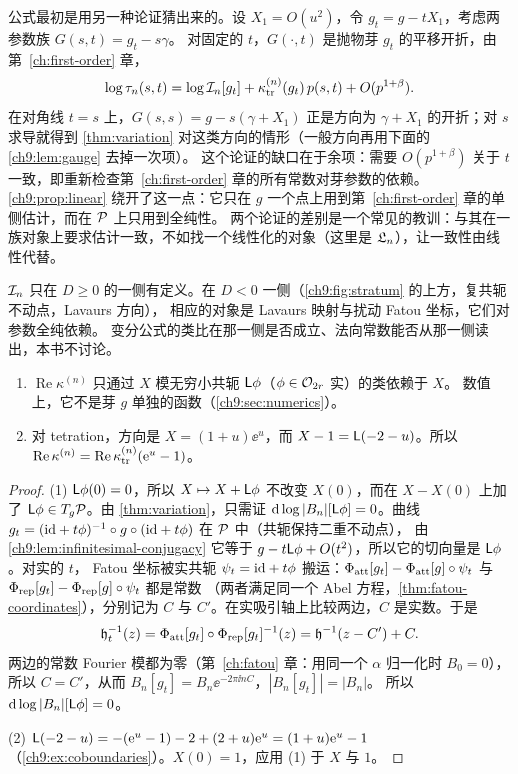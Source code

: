 \begin{remark}[为什么不用两参数论证]\label{ch9:rem:two-parameter}
公式最初是用另一种论证猜出来的。设 $X_1=O(u^2)$，令 $g_t=g-tX_1$，考虑两参数族 $G(s,t)=g_t-s\gamma$。
对固定的 $t$，$G(\cdot,t)$ 是抛物芽 $g_t$ 的平移开折，由第~\ref{ch:first-order} 章，
\[
 \log\tau_n(s,t)=\log\mathcal I_n[g_t]+\kappa_{\mathrm{tr}}^{(n)}(g_t)\,p(s,t)+O(p^{1+\beta}) .
\]
在对角线 $t=s$ 上，$G(s,s)=g-s(\gamma+X_1)$ 正是方向为 $\gamma+X_1$ 的开折；对 $s$ 求导就得到 \cref{thm:variation} 对这类方向的情形（一般方向再用下面的 \cref{ch9:lem:gauge} 去掉一次项）。
这个论证的缺口在于余项：需要 $O(p^{1+\beta})$ 关于 $t$ 一致，即重新检查第~\ref{ch:first-order} 章的所有常数对芽参数的依赖。
\cref{ch9:prop:linear} 绕开了这一点：它只在 $g$ 一个点上用到第~\ref{ch:first-order} 章的单侧估计，而在 $\mathcal P$ 上只用到全纯性。
两个论证的差别是一个常见的教训：与其在一族对象上要求估计一致，不如找一个线性化的对象（这里是 $\mathfrak L_n$），让一致性由线性代替。
\end{remark}

\begin{remark}[另一侧]
$\mathcal I_n$ 只在 $D\ge0$ 的一侧有定义。在 $D<0$ 一侧（\cref{ch9:fig:stratum} 的上方，复共轭不动点，Lavaurs 方向），
相应的对象是 Lavaurs 映射与扰动 Fatou 坐标，它们对参数全纯依赖\cite{Shishikura2000,InouShishikura}。
变分公式的类比在那一侧是否成立、法向常数能否从那一侧读出，本书不讨论。
\end{remark}

\begin{corollary}\label{cor:variation}
\begin{enumerate}
\item $\operatorname{Re}\kappa^{(n)}$ 只通过 $X$ 模无穷小共轭 $\mathsf L\phi$（$\phi\in\mathcal O_{2r}$ 实）的类依赖于 $X$。
  数值上，它不是芽 $g$ 单独的函数（\cref{ch9:sec:numerics}）。
\item 对 tetration，方向是 $X=(1+u)\ee^u$，而 $X-1=\mathsf L(-2-u)$。所以 $\operatorname{Re}\kappa^{(n)}=\operatorname{Re}\kappa_{\mathrm{tr}}^{(n)}(\mathrm{e}^u-1)$。
\end{enumerate}
\end{corollary}

\begin{proof}
(1) $\mathsf L\phi(0)=0$，所以 $X\mapsto X+\mathsf L\phi$ 不改变 $X(0)$，而在 $X-X(0)$ 上加了 $\mathsf L\phi\in T_g\mathcal P$。由 \cref{thm:variation}，只需证
$\mathrm{d}\log|B_n|[\mathsf L\phi]=0$。曲线 $g_t=(\mathrm{id}+t\phi)^{-1}\circ g\circ(\mathrm{id}+t\phi)$ 在 $\mathcal P$ 中（共轭保持二重不动点），
由 \cref{ch9:lem:infinitesimal-conjugacy} 它等于 $g-t\mathsf L\phi+O(t^2)$，所以它的切向量是 $\mathsf L\phi$。对实的 $t$，
Fatou 坐标被实共轭 $\psi_t=\mathrm{id}+t\phi$ 搬运：$\Phi_{\mathrm{att}}[g_t]-\Phi_{\mathrm{att}}[g]\circ\psi_t$ 与 $\Phi_{\mathrm{rep}}[g_t]-\Phi_{\mathrm{rep}}[g]\circ\psi_t$ 都是常数
（两者满足同一个 Abel 方程，\cref{thm:fatou-coordinates}），分别记为 $C$ 与 $C'$。在实吸引轴上比较两边，$C$ 是实数。于是
\[
 \mathfrak h_t^{-1}(z)=\Phi_{\mathrm{att}}[g_t]\circ\Phi_{\mathrm{rep}}[g_t]^{-1}(z)=\mathfrak h^{-1}(z-C')+C .
\]
两边的常数 Fourier 模都为零（第~\ref{ch:fatou} 章：用同一个 $\alpha$ 归一化时 $B_0=0$），所以 $C=C'$，从而 $B_n[g_t]=B_n\ee^{-2\pi\ii nC}$，$|B_n[g_t]|=|B_n|$。
所以 $\mathrm{d}\log|B_n|[\mathsf L\phi]=0$。

(2) $\mathsf L(-2-u)=-(\mathrm{e}^u-1)-2+(2+u)\mathrm{e}^u=(1+u)\mathrm{e}^u-1$（\cref{ch9:ex:coboundaries}）。$X(0)=1$，应用 (1) 于 $X$ 与 $1$。
\end{proof}

